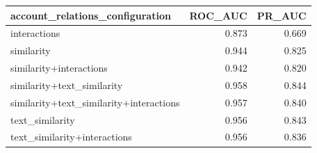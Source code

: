 \begin{tabular}{lrr}
\toprule
account_relations_configuration & ROC_AUC & PR_AUC \\
\midrule
interactions & 0.873 & 0.669 \\
similarity & 0.944 & 0.825 \\
similarity+interactions & 0.942 & 0.820 \\
similarity+text_similarity & 0.958 & 0.844 \\
similarity+text_similarity+interactions & 0.957 & 0.840 \\
text_similarity & 0.956 & 0.843 \\
text_similarity+interactions & 0.956 & 0.836 \\
\bottomrule
\end{tabular}
